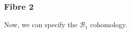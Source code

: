 \documentclass[11pt]{article}
\newcommand{\be}{\begin{equation}}
\newcommand{\ee}{\end{equation}}
\renewcommand{\L}{\mathcal{L}}
\newcommand{\B}{\mathcal{B}}
\newcommand{\bs}[1]{\boldsymbol{#1}}
\newcommand{\mat}[1]{\underline{\boldsymbol{#1}}}
\begin{document}


\subsubsection{Fibre 2}
Now, we can specify the $\B_1$ cohomology. 
\end{document}
